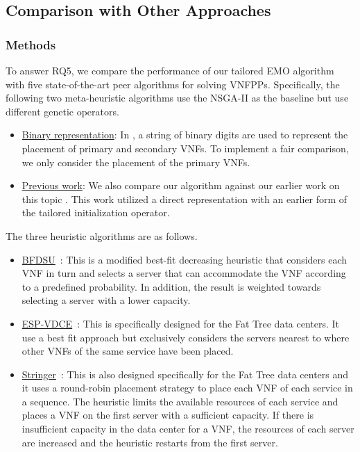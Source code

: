 \subsection{Comparison with Other Approaches}
\label{sec:state_of_the_art}

\subsubsection{Methods}
To answer RQ5, we compare the performance of our tailored EMO algorithm with five state-of-the-art peer algorithms for solving VNFPPs. Specifically, the following two meta-heuristic algorithms use the NSGA-II as the baseline but use different genetic operators.
\begin{itemize}
    \item\underline{Binary representation}: In \cite{ChantreF20}, a string of binary digits are used to represent the placement of primary and secondary VNFs. To implement a fair comparison, we only consider the placement of the primary VNFs.
    \item\underline{Previous work}: We also compare our algorithm against our earlier work on this topic \cite{BillingsleyLMMG19}. This work utilized a direct representation with an earlier form of the tailored initialization operator.
\end{itemize}
The three heuristic algorithms are as follows.
\begin{itemize}
    \item\underline{BFDSU}~\cite{ZhangXLLGW17}: This is a modified best-fit decreasing heuristic that considers each VNF in turn and selects a server that can accommodate the VNF according to a predefined probability. In addition, the result is weighted towards selecting a server with a lower capacity.
    \item\underline{ESP-VDCE}~\cite{KaurGK020}: This is specifically designed for the Fat Tree data centers. It use a best fit approach but exclusively considers the servers nearest to where other VNFs of the same service have been placed.
    \item\underline{Stringer}~\cite{ChuaWZSH16}: This is also designed specifically for the Fat Tree data centers and it uses a round-robin placement strategy to place each VNF of each service in a sequence. The heuristic limits the available resources of each service and places a VNF on the first server with a sufficient capacity. If there is insufficient capacity in the data center for a VNF, the resources of each server are increased and the heuristic restarts from the first server.
\end{itemize}
